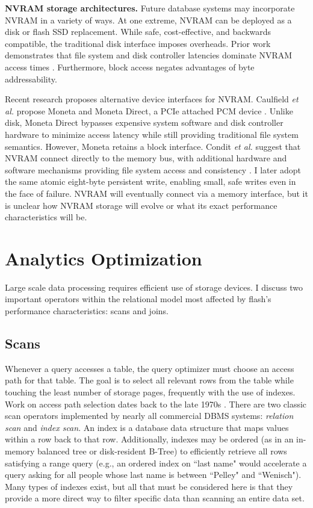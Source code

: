 \textbf{NVRAM storage architectures.}
Future database systems may incorporate NVRAM in a variety of ways.
At one extreme, NVRAM can be deployed as a disk or flash SSD replacement.
While safe, cost-effective, and backwards compatible, the traditional disk interface imposes overheads.
Prior work demonstrates that file system and disk controller latencies dominate NVRAM access times \cite{CaulfieldDe10}.
Furthermore, block access negates advantages of byte addressability.

Recent research proposes alternative device interfaces for NVRAM.
Caulfield \emph{et al.} propose Moneta and Moneta Direct, a PCIe attached PCM device \cite{CaulfieldMollov12}.
Unlike disk, Moneta Direct bypasses expensive system software and disk controller hardware to minimize access latency while still providing traditional file system semantics.
However, Moneta retains a block interface.
Condit \emph{et al.} suggest that NVRAM connect directly to the memory bus, with additional hardware and software mechanisms providing file system access and consistency \cite{ConditNightingale09}.
I later adopt the same atomic eight-byte persistent write, enabling small, safe writes even in the face of failure.
NVRAM will eventually connect via a memory interface, but it is unclear how NVRAM storage will evolve or what its exact performance characteristics will be.

\section{Analytics Optimization}
\label{sec:Background:Analytics}

Large scale data processing requires efficient use of storage devices.
I discuss two important operators within the relational model most affected by flash's performance characteristics: scans and joins.

\subsection{Scans}
\label{sec:Background:Scans}

Whenever a query accesses a table, the query optimizer must choose an access path for that table. 
The goal is to select all relevant rows from the table while touching the least number of storage pages, frequently with the use of indexes.
Work on access path selection dates back to the late 1970s \cite{Selinger1979}.
There are two classic scan operators implemented by nearly all commercial DBMS systems: \emph{relation scan} and \emph{index scan}.
An index is a database data structure that maps values within a row back to that row.
Additionally, indexes may be ordered (as in an in-memory balanced tree or disk-resident B-Tree) to efficiently retrieve all rows satisfying a range query (e.g., an ordered index on ``last name" would accelerate a query asking for all people whose last name is between ``Pelley" and ``Wenisch").
Many types of indexes exist, but all that must be considered here is that they provide a more direct way to filter specific data than scanning an entire data set.

